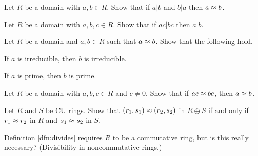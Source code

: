 \begin{exercise}
Let \(R\) be a domain with \(a,b \in R\).
Show that if \(a|b\) and \(b|a\) then \(a \approx b\).
\end{exercise}

\begin{exercise}
Let \(R\) be a domain with \(a,b,c \in R\).
Show that if \(ac|bc\) then \(a|b\).
\end{exercise}

\begin{exercise}
Let \(R\) be a domain and \(a,b \in R\) such that \(a \approx b\).
Show that the following hold.
\begin{proplist*}
\item If \(a\) is irreducible, then \(b\) is irreducible.
\item If \(a\) is prime, then \(b\) is prime.
\end{proplist*}
\end{exercise}

\begin{exercise}
Let \(R\) be a domain with \(a,b,c \in R\) and \(c \neq 0\).
Show that if \(ac \approx bc\), then \(a \approx b\).
\end{exercise}

\begin{exercise}
Let \(R\) and \(S\) be CU rings.
Show that \((r_1,s_1) \approx (r_2,s_2)\) in \(R \oplus S\) if and only if \(r_1 \approx r_2\) in \(R\) and \(s_1 \approx s_2\) in \(S\).
\end{exercise}

\begin{exercise}
Definition \ref{dfn:divides} requires \(R\) to be a commutative ring, but is this really necessary? (Divisibility in noncommutative rings.)
\end{exercise}
